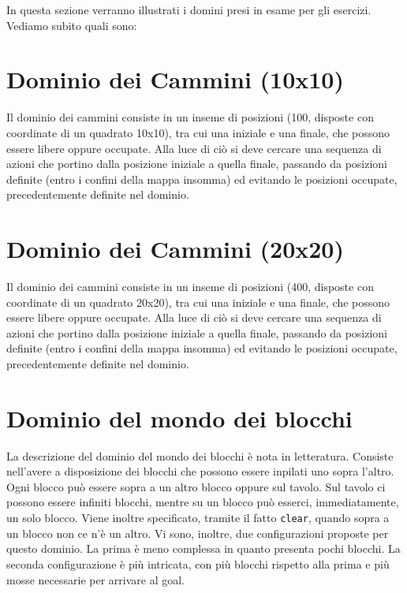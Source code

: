 In questa sezione verranno illustrati i domini presi in esame per gli esercizi. Vediamo subito quali sono:

\section{Dominio dei Cammini (10x10)} \label{sec:cammini:10x10}
Il dominio dei cammini consiste in un inseme di posizioni (100, disposte con coordinate di un quadrato 10x10), tra cui una iniziale e una finale, che possono essere libere oppure occupate. Alla luce di ciò si deve cercare una sequenza di azioni che portino dalla posizione iniziale a quella finale, passando da posizioni definite (entro i confini della mappa insomma) ed evitando le posizioni occupate, precedentemente definite nel dominio.

\section{Dominio dei Cammini (20x20)} \label{sec:cammini:20x20}
Il dominio dei cammini consiste in un inseme di posizioni (400, disposte con coordinate di un quadrato 20x20), tra cui una iniziale e una finale, che possono essere libere oppure occupate. Alla luce di ciò si deve cercare una sequenza di azioni che portino dalla posizione iniziale a quella finale, passando da posizioni definite (entro i confini della mappa insomma) ed evitando le posizioni occupate, precedentemente definite nel dominio.

\section{Dominio del mondo dei blocchi} \label{sec:blocchi}
La descrizione del dominio del mondo dei blocchi è nota in letteratura. Consiste nell'avere a disposizione dei blocchi che possono essere inpilati uno sopra l'altro. Ogni blocco può essere sopra a un altro blocco oppure sul tavolo. Sul tavolo ci possono essere infiniti blocchi, mentre su un blocco può esserci, immediatamente, un solo blocco. Viene inoltre specificato, tramite il fatto \texttt{clear}, quando sopra a un blocco non ce n'è un altro.
Vi sono, inoltre, due configurazioni proposte per questo dominio. La prima è meno complessa in quanto presenta pochi blocchi. La seconda configurazione è più intricata, con più blocchi rispetto alla prima e più mosse necessarie per arrivare al goal.

